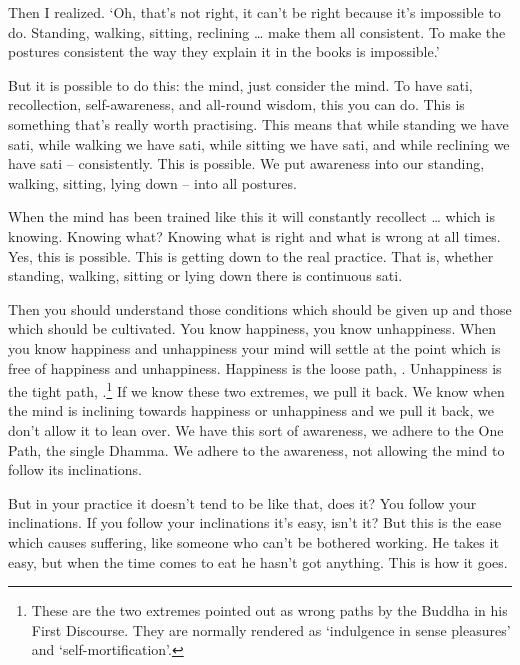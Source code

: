 Then I realized. `Oh, that's not right, it can't be right because it's impossible to do. Standing, walking, sitting, reclining \ldots{} make them all consistent. To make the postures consistent the way they explain it in the books is impossible.' 

But it is possible to do this: the mind, just consider the mind. To have sati, recollection,  self-awareness, and  all-round wisdom, this you can do. This is something that's really worth practising. This means that while standing we have sati, while walking we have sati, while sitting we have sati, and while reclining we have sati -- consistently. This is possible. We put awareness into our standing, walking, sitting, lying down -- into all postures. 

When the mind has been trained like this it will constantly recollect  \ldots{} which is knowing. Knowing what? Knowing what is right and what is wrong at all times. Yes, this is possible. This is getting down to the real practice. That is, whether standing, walking, sitting or lying down there is continuous sati. 

Then you should understand those conditions which should be given up and those which should be cultivated. You know happiness, you know unhappiness. When you know happiness and unhappiness your mind will settle at the point which is free of happiness and unhappiness. Happiness is the loose path, . Unhappiness is the tight path, .\footnote{These are the two extremes pointed out as wrong paths by the Buddha in his First Discourse. They are normally rendered as `indulgence in sense pleasures' and `self-mortification'.} If we know these two extremes, we pull it back. We know when the mind is inclining towards happiness or unhappiness and we pull it back, we don't allow it to lean over. We have this sort of awareness, we adhere to the One Path, the single Dhamma. We adhere to the awareness, not allowing the mind to follow its inclinations. 

But in your practice it doesn't tend to be like that, does it? You follow your inclinations. If you follow your inclinations it's easy, isn't it? But this is the ease which causes suffering, like someone who can't be bothered working. He takes it easy, but when the time comes to eat he hasn't got anything. This is how it goes. 


